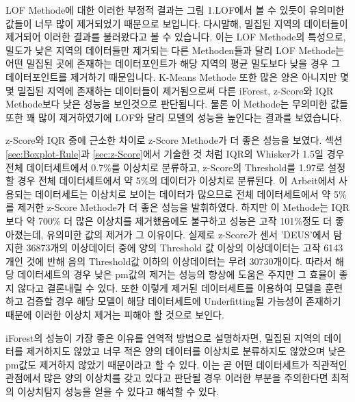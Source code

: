         LOF Methode에 대한 이러한 부정적 결과는 그림 1.LOF에서 볼 수 있듯이 유의미한 값들이 너무 많이 제거되었기 때문으로 보입니다. 다시말해, 밀집된 지역의 데이터들이 제거되어 이러한 결과를 불러왔다고 볼 수 있습니다. 이는 LOF Methode의 특성으로, 밀도가 낮은 지역의 데이터들만 제거되는 다른 Methoden들과 달리 LOF Methode는 어떤 밀집된 곳에 존재하는 데이터포인트가 해당 지역의 평균 밀도보다 낮을 경우 그 데이터포인트를 제거하기 때문입니다. K-Means Methode 또한 많은 양은 아니지만 몇몇 밀집된 지역에 존재하는 데이터들이 제거됨으로써 다른 iForest, z-Score와 IQR Methode보다 낮은 성능을 보인것으로 판단됩니다. 물론 이 Methode는 무의미한 값들 또한 꽤 많이 제거하였기에 LOF와 달리 모델의 성능을 높인다는 결과를 보였습니다.

        z-Score와 IQR 중에 근소한 차이로 z-Score Methode가 더 좋은 성능을 보였다. 섹션 \ref{sec:Boxplot-Rule}과 \ref{sec:z-Score}에서 기술한 것 처럼 IQR의 Whisker가 1.5일 경우 전체 데이터세트에서 0.7\%를 이상치로 분류하고, z-Score의 Threshold를 1.97로 설정할 경우 전체 데이터세트에서 약 5\%의 데이터가 이상치로 분류된다. 이 Arbeit에서 사용되는 데이터세트는 이상치로 보이는 데이터가 많으므로 전체 데이터세트에서 약 5\%를 제거한 z-Score Methode가 더 좋은 성능을 발휘하였다. 하지만 이 Methode는 IQR보다 약 700\% 더 많은 이상치를 제거했음에도 불구하고 성능은 고작 101\%정도 더 좋아졌는데, 유의미한 값의 제거가 그 이유이다. 실제로 z-Score가 센서 'DEUS'에서 탐지한 36873개의 이상데이터 중에 양의 Threshold 값 이상의 이상데이터는 고작 6143개인 것에 반해 음의 Threshold값 이하의 이상데이터는 무려 30730개이다. 따라서 해당 데이터세트의 경우 낮은 pm값의 제거는 성능의 향상에 도움은 주지만 그 효율이 좋지 않다고 결론내릴 수 있다. 또한 이렇게 제거된 데이터세트를 이용하여 모델을 훈련하고 검증할 경우 해당 모델이 해당 데이터세트에 Underfitting될 가능성이 존재하기 때문에 이러한 이상치 제거는 피해야 할 것으로 보인다.

        iForest의 성능이 가장 좋은 이유를 연역적 방법으로 설명하자면, 밀집된 지역의 데이터를 제거하지도 않았고 너무 적은 양의 데이터를 이상치로 분류하지도 않았으며 낮은 pm값도 제거하지 않았기 때문이라고 할 수 있다. 이는 곧 어떤 데이터세트가 직관적인 관점에서 많은 양의 이상치를 갖고 있다고 판단될 경우 이러한 부분을 주의한다면 최적의 이상치탐지 성능을 얻을 수 있다고 해석할 수 있다.